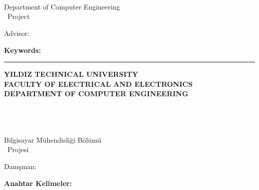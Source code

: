 
\ifnum{}
\ifnum{}
\newpage
\chapter*{\eabstract}

\begin{center}
{\bfseries \Large\titleEN}

\studenti \\ \studentii

Department of Computer Engineering \\ {\degree~Project}

Advisor: \advisorEN

\end{center}

\abstractTextEnglish

{\bfseries Keywords:} \abstractKeywordsEnglish

\vfill

\begin{center}
\rule{0.8\textwidth}{.1pt}

\bfseries \small
 YILDIZ TECHNICAL UNIVERSITY\\
 FACULTY OF ELECTRICAL AND ELECTRONICS\\
 DEPARTMENT OF COMPUTER ENGINEERING
\end{center}

\newpage
\chapter*{\tabstract}

\begin{center}
{\bfseries \Large\titleTR}

\studenti \\ \studentii

Bilgisayar Mühendisliği Bölümü \\ {\tdegree~Projesi}

Danışman: \advisorTR

\end{center}

\abstractTextTurkish

{\bfseries Anahtar Kelimeler:} \abstractKeywordsTurkish

